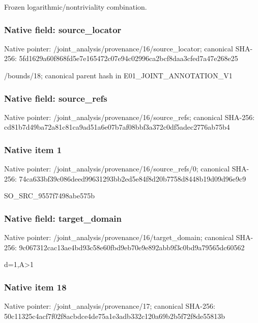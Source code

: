 \documentclass[10pt,a4paper]{article}
\begin{document}
\begingroup\raggedright\sloppy Frozen logarithmic/\allowbreak{}nontriviality combination.\par\endgroup

\subsubsection{Native field: source\_\allowbreak{}locator}
Native pointer: /joint\_\allowbreak{}analysis/provenance/16/source\_\allowbreak{}locator; canonical SHA-256: 5fd1629a60f868fd5e7e165472c07e94c02996ca2bcf8daa3cfed7a47e268e25

\begingroup\raggedright\sloppy /\allowbreak{}bounds/\allowbreak{}18;\allowbreak{} canonical parent hash in E01\_\allowbreak{}JOINT\_\allowbreak{}ANNOTATION\_\allowbreak{}V1\par\endgroup

\subsubsection{Native field: source\_\allowbreak{}refs}
Native pointer: /joint\_\allowbreak{}analysis/provenance/16/source\_\allowbreak{}refs; canonical SHA-256: cd81b7d49ba72a81c81ca9ad51a6e07b7af08bbf3a372c0df5adec2776ab75b4

\subsubsection{Native item 1}
Native pointer: /joint\_\allowbreak{}analysis/provenance/16/source\_\allowbreak{}refs/0; canonical SHA-256: 74ca633bf39c086deed99631293bb2ed5e84f8d20b7758d8448b19d09d96e9c9

\begingroup\raggedright\sloppy SO\_\allowbreak{}SRC\_\allowbreak{}9557f7498abe575b\par\endgroup

\subsubsection{Native field: target\_\allowbreak{}domain}
Native pointer: /joint\_\allowbreak{}analysis/provenance/16/target\_\allowbreak{}domain; canonical SHA-256: 9c067312cac13ae4bd93c58e60fbd9eb70e9e892abb9f3c0bd9a79565dc60562

\begingroup\raggedright\sloppy d=\allowbreak{}1,\allowbreak{}A>1\par\endgroup

\subsubsection{Native item 18}
Native pointer: /joint\_\allowbreak{}analysis/provenance/17; canonical SHA-256: 50c11325c4acf7f02f8acbdce4de75a1e3adb332c120a69b2b5f72f8de55813b
\end{document}
